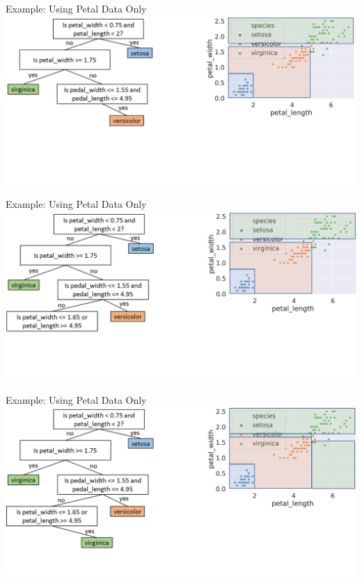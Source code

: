 \documentclass[aspectratio=169]{../latex_main/tntbeamer}  %
\begin{document}
	
	\begin{frame}{Example: Using Petal Data Only}
	        \includegraphics[scale=.34]{figure_tree/Bild11}
	\end{frame}
	
	
	\begin{frame}{Example: Using Petal Data Only}
	        \includegraphics[scale=.34]{figure_tree/Bild12}
	\end{frame}
	
	
	\begin{frame}{Example: Using Petal Data Only}
	        \includegraphics[scale=.34]{figure_tree/Bild13}
	\end{frame}
	
\end{document}

